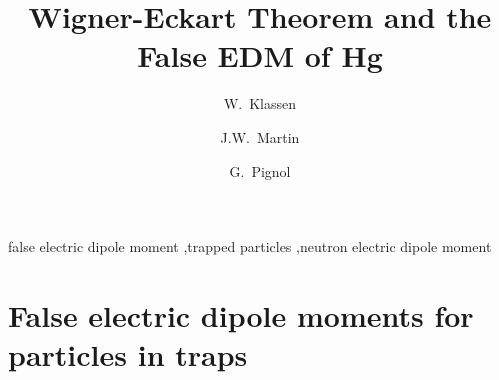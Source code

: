 \documentclass[preprint,12pt]{elsarticle}
\begin{document}
\begin{frontmatter}


\title{Wigner-Eckart Theorem and the False EDM of Hg}




\author[um]{W.~Klassen}
\author[uw,um]{J.W.~Martin}
\author[lpc]{G.~Pignol}

\address[um]{Physics and Astronomy, University of Manitoba, Winnipeg, MB R3T 2N2}
\address[uw]{Department of Physics, The University of Winnipeg, Winnipeg, MB R3B 2E9}
\address[lpc]{LPC Grenoble}

\begin{abstract}

\end{abstract}

\begin{keyword}
false electric dipole moment \sep trapped particles \sep neutron electric dipole moment


\end{keyword}

\end{frontmatter}


\section{False electric dipole moments for particles in traps}
\label{sec:intro}
\end{document}
